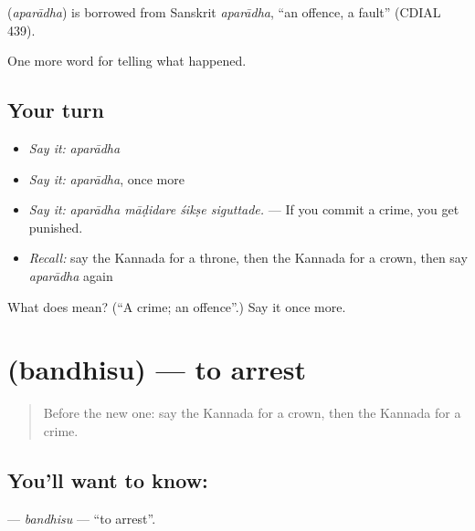 \begin{cousinweb}
\textbf{} (\emph{aparādha}) is borrowed from Sanskrit \emph{aparādha}, \textquotedblleft{}an offence, a fault\textquotedblright{} (CDIAL 439).
\end{cousinweb}

\begin{grammarlens}[title={What you've built}]
One more word for telling what happened.
\end{grammarlens}

\subsection*{Your turn}
\begin{itemize}
\raggedright
  \item \emph{Say it:} \emph{aparādha}
  \item \emph{Say it:} \emph{aparādha}, once more
  \item \emph{Say it:} \emph{aparādha māḍidare śikṣe siguttade.} — If you commit a crime, you get punished.
  \item \emph{Recall:} say the Kannada for a throne, then the Kannada for a crown, then say \emph{aparādha} again
\end{itemize}

\begin{tcolorbox}[breakable,colback=teal!4,colframe=teal!35!black,title={Before you move on}]
What does  mean? (\textquotedblleft{}A crime; an offence\textquotedblright{}.) Say it once more.
\end{tcolorbox}
\section[\texorpdfstring{\kn{ಬಂಧಿಸು} (bandhisu)}{ಬಂಧಿಸು (bandhisu)}]{ (bandhisu) — to arrest}

\label{lesson:KA-C323-bandhisu}



\begin{quote}
Before the new one: say the Kannada for a crown, then the Kannada for a crime.
\end{quote}

\subsection*{You'll want to know: }
\textbf{} — \emph{bandhisu} — \textquotedblleft{}to arrest\textquotedblright{}.

